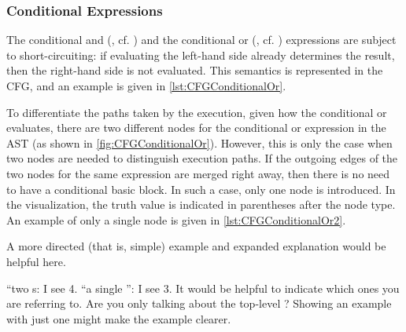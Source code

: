 \subsubsection{Conditional Expressions}
\label{sec:cond-exp}

The conditional and (\code{&&}, cf. ) and the conditional
or (\code{||}, cf. ) expressions are subject to short-circuiting:
if evaluating the left-hand side already determines the result, then the right-hand
side is not evaluated. This semantics is represented in the CFG, and an example
is given in \autoref{lst:CFGConditionalOr}.

To differentiate the paths taken by the execution, given how the conditional or evaluates,
there are two different nodes for the conditional or expression in the AST
(as shown in \autoref{fig:CFGConditionalOr}). However, this is only the case when
two nodes are needed to distinguish execution paths. If the outgoing edges
of the two nodes for the same expression are merged right away, then there is
no need to have a conditional basic block. In such a case, only one
node is introduced. In the visualization, the truth value is indicated in
parentheses after the node type. An example of only a single node is given in
\autoref{lst:CFGConditionalOr2}.

\begin{workinprogress}
A more directed (that is, simple) example and expanded explanation would be helpful here.
\end{workinprogress}


\begin{workinprogress}
  ``two s:  I see 4.  ``a single
  '': I see 3.  It would be helpful to indicate
  which ones you are referring to.  Are you only talking about the
  top-level \code{||}?  Showing an example with just one \code{||} might
  make the example clearer.
\end{workinprogress}



